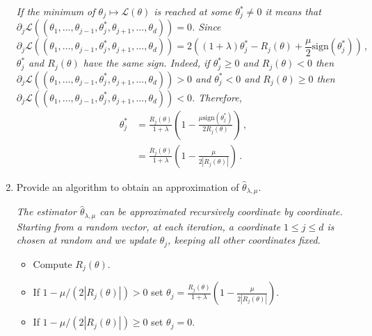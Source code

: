 \documentclass[a4paper,10pt,fleqn]{article}
\newcommand{\eqsp}{\,}
\newcommand{\1}{\ensuremath{\mathbbm{1}}}
\begin{document}
\begin{enumerate}
\vspace{.2cm}

{\em
If the minimum of $\theta_j \mapsto \mathcal{L}(\theta)$ is reached at some $\theta^*_j\neq 0$ it means that $\partial_j  \mathcal{L}((\theta_1,\ldots,\theta_{j-1},\theta^*_j,\theta_{j+1},\ldots,\theta_d)) = 0$. Since
$$
\partial_j  \mathcal{L}((\theta_1,\ldots,\theta_{j-1},\theta^*_j,\theta_{j+1},\ldots,\theta_d)) = 2\left((1+\lambda)\theta^*_j -R_j(\theta) + \frac{\mu}{2} \mathrm{sign}(\theta^*_j)\right)\eqsp,
$$
$\theta^*_j$ and $R_j(\theta)$ have the same sign. Indeed, if $\theta^*_j\geq 0 $ and  $R_j(\theta)<0$ then $\partial_j  \mathcal{L}((\theta_1,\ldots,\theta_{j-1},\theta^*_j,\theta_{j+1},\ldots,\theta_d))>0$ and  $\theta^*_j<0 $ and  $R_j(\theta)\geq 0$ then $\partial_j  \mathcal{L}((\theta_1,\ldots,\theta_{j-1},\theta^*_j,\theta_{j+1},\ldots,\theta_d))<0$. Therefore,
\begin{align*}
\theta^*_j &= \frac{R_j(\theta)}{1+\lambda}\left(1 - \frac{\mu\mathrm{sign}(\theta^*_j)}{2R_j(\theta)}\right)\eqsp,\\
&= \frac{R_j(\theta)}{1+\lambda}\left(1 - \frac{\mu}{2|R_j(\theta)|}\right)\eqsp.
\end{align*}
}
\item Provide an algorithm to obtain an approximation of $\widehat{\theta}_{\lambda,\mu}$.

\vspace{.2cm}

{\em
The estimator $\widehat{\theta}_{\lambda,\mu}$ can be approximated recursively coordinate by coordinate. Starting from a random vector, at each iteration, a coordinate $1\leq j \leq d$ is chosen at random and we update $\theta_j$, keeping all other coordinates fixed. 
\begin{itemize}
\item Compute $R_j(\theta)$.
\item If $1 - \mu/(2|R_j(\theta)|) >0 $ set $\theta_j = \frac{R_j(\theta)}{1+\lambda}\left(1 - \frac{\mu}{2|R_j(\theta)|}\right)$.
\item If $1 - \mu/(2|R_j(\theta)|) \geq 0 $ set $\theta_j = 0$.
\end{itemize} 
}
\end{enumerate}
\end{document}
